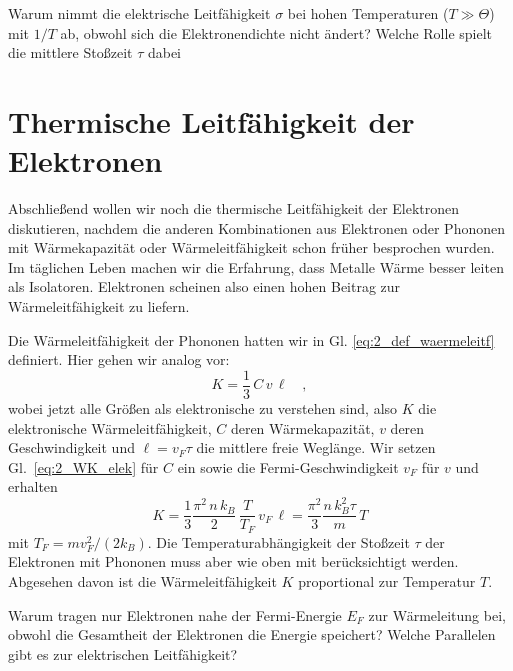 \begin{questions}
    \item Warum nimmt die elektrische Leitfähigkeit $\sigma$ bei hohen Temperaturen ($T \gg \Theta$) mit $1/T$ ab, obwohl sich die Elektronendichte nicht ändert? Welche Rolle spielt die mittlere Stoßzeit $\tau$ dabei
\end{questions}

\section{Thermische Leitfähigkeit der Elektronen}

Abschließend wollen wir noch die thermische Leitfähigkeit der Elektronen diskutieren, nachdem die anderen Kombinationen aus Elektronen oder Phononen mit Wärmekapazität oder Wärmeleitfähigkeit schon früher besprochen wurden. Im täglichen Leben machen wir die Erfahrung, dass Metalle Wärme besser leiten als Isolatoren. Elektronen scheinen also einen hohen Beitrag zur Wärmeleitfähigkeit zu liefern.

Die  Wärmeleitfähigkeit der Phononen hatten wir in Gl. \ref{eq:2_def_waermeleitf} definiert. Hier gehen wir analog vor:
\begin{equation}
   K  = \frac{1}{3} \, C \, v \, \ell \quad , 
\end{equation}
wobei jetzt alle Größen als elektronische zu verstehen sind, also $K$ die elektronische Wärmeleitfähigkeit, $C$ deren Wärmekapazität, $v$ deren Geschwindigkeit und $\ell =  v_F \tau$ die mittlere freie Weglänge. Wir setzen Gl.~\ref{eq:2_WK_elek} für $C$ ein sowie die Fermi-Geschwindigkeit $v_F$ für $v$  und erhalten
\begin{equation}
   K  =  \frac{1}{3} \frac{\pi^2 \, n \, k_B}{2}  \, \frac{T}{T_F}  \, v_F \, \ell
   =     \frac{\pi^2 }{3} \frac{ n \, k_B^2 \tau}{m}  \, T 
\end{equation}
mit $T_F = m v_F^2 / (2 k_B)$. Die Temperaturabhängigkeit der Stoßzeit $\tau$ der Elektronen mit Phononen muss aber wie oben mit berücksichtigt werden. Abgesehen davon ist die Wärmeleitfähigkeit $K$ proportional zur Temperatur $T$.


\begin{questions}
    \item Warum tragen nur Elektronen nahe der Fermi-Energie $E_F$ zur Wärmeleitung bei, obwohl die Gesamtheit der Elektronen die Energie speichert? Welche Parallelen gibt es zur elektrischen Leitfähigkeit?

\end{questions}

